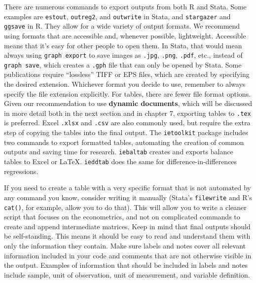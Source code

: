 There are numerous commands to export outputs from both R and Stata.
Some examples are \texttt{estout},\cite{estout05, estout07}
\texttt{outreg2},
and \texttt{outwrite} in Stata,
and \texttt{stargazer}
and \texttt{ggsave} in R.
They allow for a wide variety of output formats. We recommend using formats that are accessible and, whenever possible, lightweight.
Accessible means that it's easy for other people to open them.
In Stata, that would mean always using \texttt{graph export} to save images as
\texttt{.jpg}, \texttt{.png}, \texttt{.pdf}, etc.,
instead of \texttt{graph save},
which creates a \texttt{.gph} file that can only be opened by Stata.
Some publications require ``lossless'' TIFF or EPS files,
which are created by specifying the desired extension.
Whichever format you decide to use,
remember to always specify the file extension explicitly.
For tables, there are fewer file format options.
Given our recommendation to use \textbf{dynamic documents},
which will be discussed in more detail both in the next section and in chapter 7,
exporting tables to \texttt{.tex} is preferred.
Excel \texttt{.xlsx} and \texttt{.csv} are also commonly used,
but require the extra step of copying the tables into the final output.
The \texttt{ietoolkit} package includes two commands to export formatted tables,
automating the creation of common outputs and saving time for research.
\texttt{iebaltab}
creates and exports balance tables to Excel or {\LaTeX}.
\texttt{ieddtab}
does the same for difference-in-differences regressions.

If you need to create a table with a very specific format
that is not automated by any command you know, consider writing it manually
(Stata's \texttt{filewrite} and R's \texttt{cat()}, for example, allow you to do that).
This will allow you to write a cleaner script that focuses on the econometrics,
and not on complicated commands to create and append intermediate matrices.
Keep in mind that final outputs should be self-standing.
This means it should be easy to read and understand them with only the information they contain.
Make sure labels and notes cover all relevant information
included in your code and comments that are not otherwise visible in the output.
Examples of information that should be included in labels and notes include sample,
unit of observation, unit of measurement, and variable definition.

